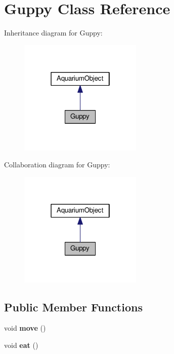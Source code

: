 \hypertarget{class_guppy}{}\section{Guppy Class Reference}
\label{class_guppy}


Inheritance diagram for Guppy\+:\nopagebreak
\begin{figure}[H]
\begin{center}
\leavevmode
\includegraphics[width=166pt]{class_guppy__inherit__graph}
\end{center}
\end{figure}


Collaboration diagram for Guppy\+:\nopagebreak
\begin{figure}[H]
\begin{center}
\leavevmode
\includegraphics[width=166pt]{class_guppy__coll__graph}
\end{center}
\end{figure}
\subsection*{Public Member Functions}
\begin{DoxyCompactItemize}
\item 
\mbox{\label{class_guppy_ae6002948d74b3741bed34a7311be4377}} 
void {\bfseries move} ()
\item 
\mbox{\label{class_guppy_afe934262a0988e4ad041f4ed3a1a7e02}} 
void {\bfseries eat} ()
\end{DoxyCompactItemize}

